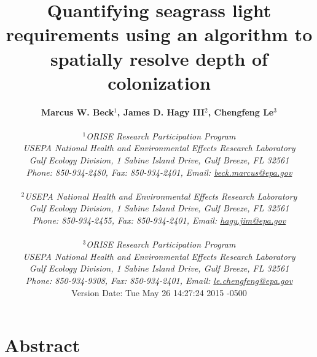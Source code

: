 \documentclass[letterpaper,12pt,oneside]{article}\usepackage[]{graphicx}\usepackage[]{color}
\begin{document}
\raggedbottom
\linenumbers
\raggedright
{}
\setlength{\parindent}{0.5in}
\renewcommand\refname{References \vspace{12pt}}

\begin{singlespace}
\title{{\bf {\Large Quantifying seagrass light requirements using an algorithm to spatially resolve depth of colonization}}}
\author{
  {\bf {\normalsize Marcus W. Beck$^1$, James D. Hagy III$^2$, Chengfeng Le$^3$}}
  \\\\{\textit {\normalsize $^1$ORISE Research Participation Program}}
  \\{\textit {\normalsize USEPA National Health and Environmental Effects Research Laboratory}}
  \\{\textit {\normalsize Gulf Ecology Division, 1 Sabine Island Drive, Gulf Breeze, FL 32561}}
	\\{\textit {\normalsize Phone: 850-934-2480, Fax: 850-934-2401, Email: \href{mailto:beck.marcus@epa.gov}{beck.marcus@epa.gov}}}
  \\\\{\textit {\normalsize $^2$USEPA National Health and Environmental Effects Research Laboratory}}
	\\{\textit {\normalsize Gulf Ecology Division, 1 Sabine Island Drive, Gulf Breeze, FL 32561}}
	\\{\textit {\normalsize Phone: 850-934-2455, Fax: 850-934-2401, Email: \href{mailto:hagy.jim@epa.gov}{hagy.jim@epa.gov}}}
  \\\\{\textit {\normalsize $^3$ORISE Research Participation Program}}
  \\{\textit {\normalsize USEPA National Health and Environmental Effects Research Laboratory}}
  \\{\textit {\normalsize Gulf Ecology Division, 1 Sabine Island Drive, Gulf Breeze, FL 32561}}
  \\{\textit {\normalsize Phone: 850-934-9308, Fax: 850-934-2401, Email: \href{mailto:le.chengfeng@epa.gov}{le.chengfeng@epa.gov}}}
  \vspace{1in} 
  \\ Version Date:   Tue May 26 14:27:24 2015 -0500
	}
\date{}
\maketitle
\end{singlespace}
\clearpage

\section*{Abstract}
\end{document}
